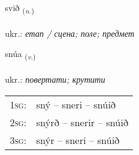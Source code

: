 \documentclass[frontgrid, backgrid]{flacards}\usepackage[]{graphicx}\usepackage[]{xcolor}
\begin{document}
\renewcommand{\flhead}{\vskip5pt \fboxsep=0pt {\small\bfseries\footnotesize Nafnorð | іменник}}
\renewcommand{\fcfoot}{\vskip5pt \fboxsep=0pt \hspace{2pt}{\small\bfseries\footnotesize 1K}}

\renewcommand{\blhead}{\vskip5pt {\small\bfseries\footnotesize Nafnorð | іменник }}
\renewcommand{\bcfoot}{\vskip5pt \hspace{2pt}{\small\bfseries\footnotesize 1K}}


{svið \small{\textsubscript{(\textit{n.})}} \\[1ex] %
\textphonetic{[svɪːð]} \\
ukr.: \emph{етап / сцена; поле; предмет} \\  [2ex]
\renewcommand*{\arraystretch}{0.8}
}

\renewcommand{\flhead}{\vskip5pt \fboxsep=0pt {\small\bfseries\footnotesize Sagnorð | дієслово}}
\renewcommand{\fcfoot}{\vskip5pt \fboxsep=0pt \hspace{2pt}{\small\bfseries\footnotesize 1K}}

\renewcommand{\blhead}{\vskip5pt {\small\bfseries\footnotesize Sagnorð | дієслово }}
\renewcommand{\bcfoot}{\vskip5pt \hspace{2pt}{\small\bfseries\footnotesize 1K}}


{snúa \small{\textsubscript{(\textit{v.})}} \\[1ex] %
\textphonetic{[stnuːa]} \\
ukr.: \emph{повертати; крутити} \\  [2ex]
\renewcommand*{\arraystretch}{0.8}
\begin{tabular}{p{1cm}l}
\textsc{1sg}: & sný -- sneri -- snúið \\ 
\textsc{2sg}: & snýrð -- snerir -- snúið \\ 
\textsc{3sg}: & snýr -- sneri -- snúið \\ 
\end{tabular}
}
\end{document}
